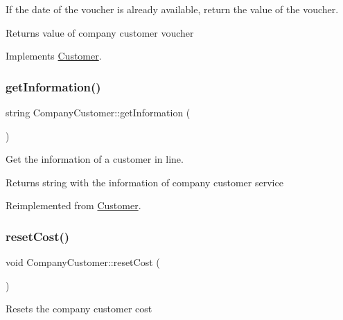 If the date of the voucher is already available, return the value of the voucher. \begin{DoxyReturn}{Returns}
value of company customer voucher 
\end{DoxyReturn}


Implements \hyperlink{classCustomer_a55df4714c5be2c2978069eda6bc32ace}{Customer}.

\hypertarget{classCompanyCustomer_a43dcc60f21c2b48e4af587314653d94d}{}\label{classCompanyCustomer_a43dcc60f21c2b48e4af587314653d94d} 
\subsubsection{\texorpdfstring{get\+Information()}{getInformation()}}
{\footnotesize\ttfamily string Company\+Customer\+::get\+Information (\begin{DoxyParamCaption}{ }\end{DoxyParamCaption})\hspace{0.3cm}{\ttfamily [virtual]}}

Get the information of a customer in line. \begin{DoxyReturn}{Returns}
string with the information of company customer service 
\end{DoxyReturn}


Reimplemented from \hyperlink{classCustomer_ae13da50be281b8f266f463a2166cad66}{Customer}.

\hypertarget{classCompanyCustomer_a20935ee3df903d3933c74e8bc2148402}{}\label{classCompanyCustomer_a20935ee3df903d3933c74e8bc2148402} 
\subsubsection{\texorpdfstring{reset\+Cost()}{resetCost()}}
{\footnotesize\ttfamily void Company\+Customer\+::reset\+Cost (\begin{DoxyParamCaption}{ }\end{DoxyParamCaption})}

Resets the company customer cost \hypertarget{classCompanyCustomer_aae3bd828d590b136e6ca407ef6f47350}{}\label{classCompanyCustomer_aae3bd828d590b136e6ca407ef6f47350} 
